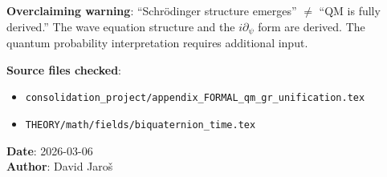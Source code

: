 \documentclass[12pt]{article}
\theoremstyle{definition}
\theoremstyle{remark}
\begin{document}
\textbf{Overclaiming warning}: ``Schrödinger structure emerges'' $\neq$ ``QM is fully derived.''
The wave equation structure and the $i\partial_\psi$ form are derived.
The quantum probability interpretation requires additional input.

\noindent\textbf{Source files checked}:
\begin{itemize}
  \item \texttt{consolidation\_project/appendix\_FORMAL\_qm\_gr\_unification.tex}
  \item \texttt{THEORY/math/fields/biquaternion\_time.tex}
\end{itemize}
\noindent\textbf{Date}: 2026-03-06\\
\textbf{Author}: David Jaroš

\ifdefined\INCLUDEMODE
\else
\end{document}
